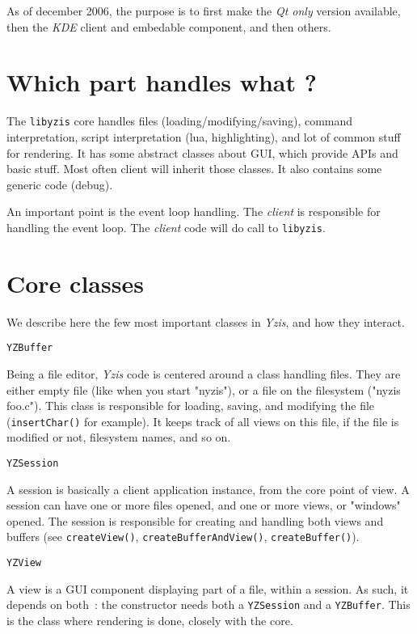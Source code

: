 \documentclass[a4paper,12pt]{report}
\begin{document}
As of december 2006, the purpose is to first make the \emph{Qt only}
version available, then the \emph{KDE} client and embedable component, and
then others.

\section{Which part handles what ?}

The \verb+libyzis+ core handles files (loading/modifying/saving), command
interpretation, script interpretation (lua, highlighting), and lot of
common stuff for rendering.
It has some abstract classes about GUI, which provide APIs and basic stuff.
Most often client will inherit those classes.
It also contains some generic code (debug).

An important point is the event loop handling. The \emph{client} is
responsible for handling the event loop. The \emph{client} code will do
call to \verb+libyzis+.

\section{Core classes}

We describe here the few most important classes in \emph{Yzis}, and how
they interact.

\verb+YZBuffer+

Being a file editor, \emph{Yzis} code is centered around a class handling
files. They are either empty file (like when you start "nyzis"), or a file on
the filesystem ("nyzis foo.c").
This class is responsible for loading, saving, and modifying the file
(\verb+insertChar()+ for example). It keeps track of all views on this file,
if the file is modified or not, filesystem names, and so on.

\verb+YZSession+

A session is basically a client application instance, from the core point
of view. A session can have one or more files opened, and one or more views,
or "windows" opened. The session is responsible for creating and handling
both views and buffers (see \verb+createView()+, \verb+createBufferAndView()+,
\verb+createBuffer()+).

\verb+YZView+

A view is a GUI component displaying part of a file, within a session. As
such, it depends on both~: the constructor needs both a
\verb+YZSession+ and a \verb+YZBuffer+. This is the class where rendering is
done, closely with the core.
\end{document}
